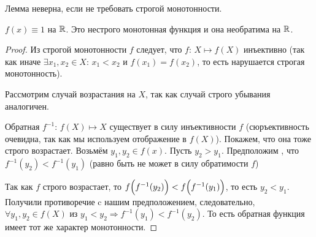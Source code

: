 \begin{note}
    Лемма неверна, если не требовать строгой монотонности.
\end{note}
\begin{example}
    $ f(x) \equiv 1 $ на $\mathbb{R}$. Это нестрого монотонная функция и она необратима на $\mathbb{R}$.
\end{example}
\begin{proof}
    Из строгой монотонности $f$ следует, что $f$: $X \mapsto f (X)$ инъективно (так как иначе $\exists x_{1}, x_{2} \in X$: $x_{1} < x_{2}$ и $f (x_{1}) = f (x_{2})$, то есть нарушается строгая монотонность).

    Рассмотрим случай возрастания на $X$, так как случай строго убывания аналогичен.

    Обратная $f^{-1}$: $f(X) \mapsto X$ существует в силу инъективности $f$ (сюръективность очевидна, так как мы используем отображение в $f (X)$). Покажем, что она тоже строго возрастает. Возьмём $y_{1}, y_{2} \in f(x)$. Пусть $y_{2} > y_{1}$. Предположим , что $f^{-1} (y_{2}) < f^{-1}(y_{1})$ (равно быть не может в силу обратимости $f$)

    Так как $f$ строго возрастает, то $f\Bigl(f^{-1}(y_{2})\Bigr) < f\Bigl(f^{-1}(y_{1})\Bigr)$, то есть $y_{2} < y_{1}$. Получили противоречие c нашим предположением, следовательно, $\forall y_{1}, y_{2} \in f(X)$ из $y_{1} < y_{2} \Rightarrow f^{-1}(y_{1}) < f^{-1}(y_{2}).$ То есть обратная функция имеет тот же характер монотонности.
\end{proof}

